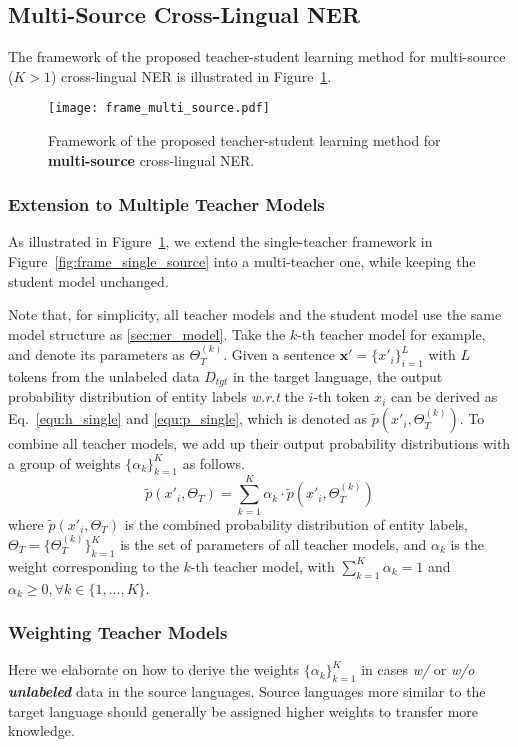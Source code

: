 \documentclass[11pt,a4paper]{article}
\newcommand\wrt{\textit{w.r.t}}
\begin{document}
	
	\subsection{Multi-Source Cross-Lingual NER}
The framework of the proposed teacher-student learning method for multi-source ($K > 1$) cross-lingual NER is illustrated in Figure~\ref{fig:frame_multi_source}. 
	
	\begin{figure}[t]
		\centering
		\texttt{[image: frame\_multi\_source.pdf]}
		\caption{Framework of the proposed teacher-student learning method for \textbf{multi-source} cross-lingual NER.}
		\label{fig:frame_multi_source}
	\end{figure}
	
	\subsubsection{Extension to Multiple Teacher Models}
As illustrated in Figure~\ref{fig:frame_multi_source}, 
we extend the single-teacher framework in Figure~\ref{fig:frame_single_source} into a multi-teacher one, while keeping the student model unchanged. 
	
	Note that, for simplicity, all teacher models and the student model use the same model structure as \ref{sec:ner_model}. 
	Take the $k$-th teacher model for example, and denote its parameters as $\Theta^{(k)}_T$. Given a sentence $\bm{x'}=\{x'_i\}_{i=1}^L$ with $L$ tokens from the unlabeled data $D_{tgt}$ in the target language, the output probability distribution of entity labels \wrt{} the $i$-th token $x_i$ can be derived as Eq.~\ref{equ:h_single} and \ref{equ:p_single}, which is denoted as $\tilde{p}(x'_i, \Theta^{(k)}_T)$.
To combine all teacher models, we add up their output probability distributions with a group of weights $\{\alpha_k\}_{k=1}^K$ as follows. \begin{equation}
	\label{equ:multi_teacher}
	\tilde{p}(x'_i, \Theta_T) = \sum_{k=1}^K \alpha_k \cdot \tilde{p}(x'_i, \Theta^{(k)}_T)
	\end{equation}
	where $\tilde{p}(x'_i, \Theta_T)$ is the combined probability distribution of entity labels, $\Theta_T=\{\Theta_T^{(k)}\}_{k=1}^K$ is the set of parameters of all teacher models, and $\alpha_k$ is the weight corresponding to the $k$-th teacher model, with $\sum_{k=1}^K \alpha_k = 1$ and $\alpha_k \geq 0, \forall k \in \{1, \ldots, K\}$.
	
	\subsubsection{Weighting Teacher Models}
	Here we elaborate on how to derive the weights $\{\alpha_k\}_{k=1}^K$ in cases \textit{w/} or \textit{w/o} \textbf{\textit{unlabeled}} data in the source languages. Source languages more similar to the target language should generally be assigned higher weights to transfer more knowledge. 
\end{document}
